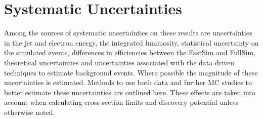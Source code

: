 %

\section{Systematic Uncertainties} \label{sec:Systematics}

Among the sources of systematic uncertainties on these results are uncertainties in the jet and electron energy, the integrated luminosity, statistical uncertainty on the simulated events, 
differences in efficiencies between the FastSim and FullSim, theoretical uncertainties and uncertainties associated with the data driven techniques to estimate 
background events.  Where possible the magnitude of these uncertainties is estimated.   Methods to use both data and further MC studies to better estimate these uncertainties are outlined here.
These effects are taken into account when calculating cross section limits and discovery potential unless otherwise noted.
%
